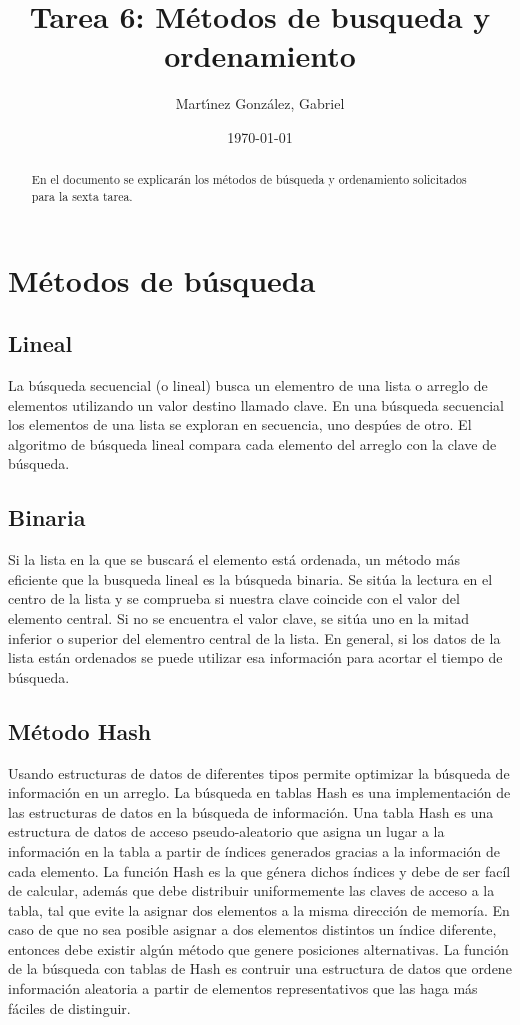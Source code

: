 \documentclass[12pt]{article}
\author{Mart\'{\i}nez Gonz\'alez, Gabriel}
\date{\today}
\title{Tarea 6: M\'etodos de busqueda y ordenamiento}
\begin{document}
\maketitle
\begin{abstract}
	En el documento se explicar\'an los m\'etodos de b\'usqueda y ordenamiento solicitados para la sexta tarea.
\end{abstract}

\section{M\'etodos de b\'usqueda}

\subsection{Lineal}
	
La b\'usqueda secuencial (o lineal) busca un elementro de una lista o arreglo de elementos utilizando un valor destino llamado clave. En una b\'usqueda secuencial los elementos de una lista se exploran en secuencia, uno desp\'ues de otro. El algoritmo de b\'usqueda lineal compara cada elemento del arreglo con la clave de b\'usqueda.

\subsection{Binaria}

Si la lista en la que se buscar\'a el elemento est\'a ordenada, un m\'etodo m\'as eficiente que la busqueda lineal es la b\'usqueda binaria. Se sit\'ua la lectura en el centro de la lista y se comprueba si nuestra clave coincide con el valor del elemento central. Si no se encuentra el valor clave, se sit\'ua uno en la mitad inferior o superior del elementro central de la lista. En general, si los datos de la lista est\'an ordenados se puede utilizar esa informaci\'on para acortar el tiempo de b\'usqueda.

\subsection{M\'etodo Hash}

Usando estructuras de datos de diferentes tipos permite optimizar la b\'usqueda de informaci\'on en un arreglo. La b\'usqueda en tablas Hash es una implementación de las estructuras de datos en la b\'usqueda de informaci\'on.
Una tabla Hash es una estructura de datos de acceso pseudo-aleatorio que asigna un lugar a la informaci\'on en la tabla a partir de \'{i}ndices generados gracias a la informaci\'on de cada elemento. La funci\'on Hash es la que g\'enera dichos \'{i}ndices y debe de ser fac\'{i}l de calcular, adem\'as que debe distribuir uniformemente las claves de acceso a la tabla, tal que evite la asignar dos elementos a la misma direcci\'on de memor\'{i}a. En caso de que no sea posible asignar a dos elementos distintos un \'{i}ndice diferente, entonces debe existir alg\'un m\'etodo que genere posiciones alternativas.
La funci\'on de la b\'usqueda con tablas de Hash es contruir una estructura de datos que ordene informaci\'on aleatoria a partir de elementos representativos que las haga m\'as f\'aciles de distinguir.
\end{document}
